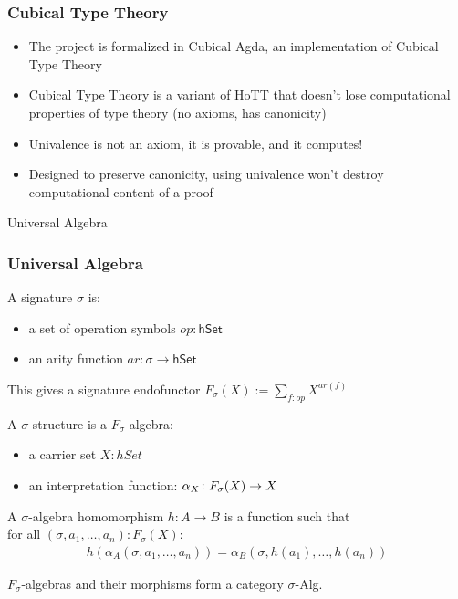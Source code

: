 \documentclass[9pt]{beamer}
\begin{document}
\begin{frame}
\frametitle{Cubical Type Theory}

\begin{itemize}

  \item The project is formalized in \alert{Cubical Agda}, an implementation of Cubical Type Theory
  \item Cubical Type Theory is a variant of HoTT that doesn't lose \alert{computational properties} of type theory
        (no axioms, has \alert{canonicity})
  \item Univalence is not an axiom, it is provable, and it computes!
  \item Designed to preserve \alert{canonicity}, using univalence won't destroy computational content of a proof

\end{itemize}


\end{frame}

\begin{frame}{Universal Algebra}
\frametitle{Universal Algebra}

A \alert{signature} $\sigma$ is:
\begin{itemize}
    \item a set of \alert{operation symbols} $op : \mathsf{hSet}$
    \item an \alert{arity function} $ar : \sigma \rightarrow \mathsf{hSet}$
\end{itemize}

This gives a signature endofunctor $F_{\sigma}(X) := \sum_{f : op} X^{ar(f)}$

A $\sigma$-structure is a $F_{\sigma}$-algebra:
\begin{itemize}
    \item a \alert{carrier set} $X : hSet$
    \item an \alert{interpretation function}: $\alpha_X\colon\Sig(X) \to X$
\end{itemize}

A $\sigma$-algebra homomorphism $h: A \rightarrow B$ is a function such that \\
for all $(\sigma, a_1, \dots, a_n) : F_{\sigma}(X)$:
\begin{align*}
    h(\alpha_A(\sigma, a_1, \dots, a_n)) = \alpha_B(\sigma, h(a_1), \dots, h(a_n))
\end{align*}

$F_{\sigma}$-algebras and their morphisms form a category $\sigma$-Alg.

\end{frame}
\end{document}
